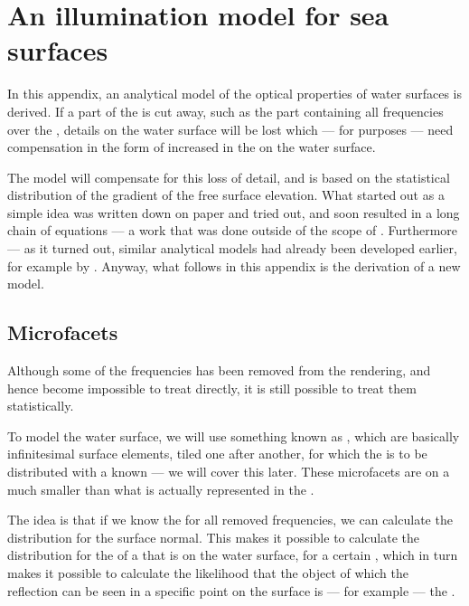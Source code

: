 \chapter{An illumination model for sea surfaces}
\label{chap:illumination_model_derivation}

In this appendix, an analytical model of the optical properties of water surfaces is derived. If a part of the  is cut away, such as the part containing all frequencies over the , details on the water surface will be lost which --- for \visualization purposes --- need compensation in the form of increased  in the  on the water surface.

The model will compensate for this loss of detail, and is based on the statistical distribution of the gradient of the free surface elevation. What started out as a simple idea was written down on paper and tried out, and soon resulted in a long chain of equations --- a work that was done outside of the scope of \thismasterthesiswork. Furthermore --- as it turned out, similar analytical models had already been developed earlier, for example by \citet{Caillault2007}. Anyway, what follows in this appendix is the derivation of a new model.

\section{Microfacets}

Although some of the frequencies has been removed from the rendering, and hence become impossible to treat directly, it is still possible to treat them statistically.

To model the water surface, we will use something known as \microfacets, which are basically infinitesimal surface elements, tiled one after another, for which the  is \assumed to be \stochastically distributed with a known  --- we will cover this later. These microfacets are on a much smaller \scale than what is actually represented in the \rendering.

The idea is that if we know the  for all removed frequencies, we can calculate the distribution for the surface normal. This makes it possible to calculate the distribution for the  of a \ray that is  on the water surface, for a certain , which in turn makes it possible to calculate the likelihood that the object of which the reflection can be seen in a specific point on the surface is --- for example --- the \sun.

